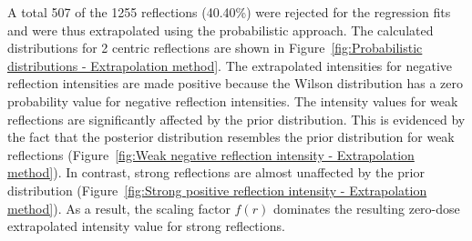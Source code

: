 A total 507 of the 1255 reflections (40.40\%) were rejected for the regression fits and were thus extrapolated using the probabilistic approach.
The calculated distributions for 2 centric reflections are shown in Figure~\ref{fig:Probabilistic distributions - Extrapolation method}.
The extrapolated intensities for negative reflection intensities are made positive because the Wilson distribution has a zero probability value for negative reflection intensities.
The intensity values for weak reflections are significantly affected by the prior distribution.
This is evidenced by the fact that the posterior distribution resembles the prior distribution for weak reflections (Figure~\ref{fig:Weak negative reflection intensity - Extrapolation method}).
In contrast, strong reflections are almost unaffected by the prior distribution (Figure~\ref{fig:Strong positive reflection intensity - Extrapolation method}).
As a result, the scaling factor $f(r)$ dominates the resulting zero-dose extrapolated intensity value for strong reflections.
